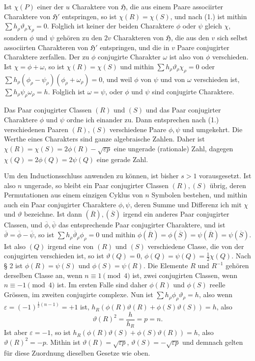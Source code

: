 \documentclass[11pt]{article}
\newcommand{\Hgr}{\mathfrak{H}}
\newcommand{\eps}{\varepsilon}
\begin{document}
Ist $\chi(P)$ einer der $u$ Charaktere von $\Hgr$, die aus einem Paare associirter Charaktere von $\Hgr'$ entspringen, so ist $\chi(R)=\chi(S)$, und nach (1.) ist mithin $\sum h_\rho\vartheta_\rho\chi_\rho=0$. Folglich ist keiner der beiden Charaktere $\phi$ oder $\psi$ gleich $\chi$, sondern $\phi$ und $\psi$ gehören zu den $2v$ Charakteren von $\Hgr$, die aus den $v$ sich selbst associirten Charakteren von $\Hgr'$ entspringen, und die in $v$ Paare conjugirter Charaktere zerfallen. Der zu $\phi$ conjugirte Charakter $\omega$ ist also von $\phi$ verschieden. Ist $\chi=\phi+\omega$, so ist $\chi(R)=\chi(S)$ und mithin $\sum h_\rho\vartheta_\rho\chi_\rho=0$ oder $\sum h_\rho(\phi_\rho-\psi_\rho)(\phi_\rho+\omega_\rho)=0$, und weil $\phi$ von $\psi$ und von $\omega$ verschieden ist, $\sum h_\rho\psi_\rho\omega_\rho=h$. Folglich ist $\omega=\psi$, oder $\phi$ und $\psi$ sind conjugirte Charaktere.

Das Paar conjugirter Classen $(R)$ und $(S)$ und das Paar conjugirter Charaktere $\phi$ und $\psi$ ordne ich einander zu. Dann entsprechen nach (1.) verschiedenen Paaren $(R),(S)$ verschiedene Paare $\phi,\psi$ und umgekehrt. Die Werthe eines Charakters sind ganze algebraische Zahlen. Daher ist $\chi(R)=\chi(S)=2\phi(R)-\sqrt{\eps p}$ eine ungerade (rationale) Zahl, dagegen $\chi(Q)=2\phi(Q)=2\psi(Q)$ eine gerade Zahl.

Um den Inductionsschluss anwenden zu können, ist bisher $s>1$ vorausgesetzt. Ist also $n$ ungerade, so bleibt ein Paar conjugirter Classen $(R),(S)$ übrig, deren Permutationen aus einem einzigen Cyklus von $n$ Symbolen bestehen, und mithin auch ein Paar conjugirter Charaktere $\phi,\psi$, deren Summe und Differenz ich mit $\chi$ und $\vartheta$ bezeichne. Ist dann $(\overline{R}),(\overline{S})$ irgend ein anderes Paar conjugirter Classen, und $\overline{\phi},\overline{\psi}$ das entsprechende Paar conjugirter Charaktere, und ist $\overline{\vartheta}=\overline{\phi}-\overline{\psi}$, so ist $\sum h_\rho\overline{\vartheta}_\rho\phi_\rho=0$ und mithin $\phi(\overline{R})=\phi(\overline{S})=\psi(\overline{R})=\psi(\overline{S})$. Ist also $(Q)$ irgend eine von $(R)$ und $(S)$ verschiedene Classe, die von der conjugirten verschieden ist, so ist $\vartheta(Q)=0$, $\phi(Q)=\psi(Q)=\frac12\chi(Q)$. Nach § 2 ist $\phi(R)=\psi(S)$ und $\phi(S)=\psi(R)$. Die Elemente $R$ und $R^{-1}$ gehören derselben Classe an, wenn $n\equiv1\pmod 4$ ist, zwei conjugirten Classen, wenn $n\equiv -1\pmod 4$ ist. Im ersten Falle sind daher $\phi(R)$ und $\phi(S)$ reelle Grössen, im zweiten conjugirte complexe. Nun ist $\sum h_\rho\phi_\rho\vartheta_\rho=h$, also wenn $\eps=(-1)^{\frac12(n-1)}=+1$ ist, $h_R(\phi(R)\vartheta(R)+\phi(S)\vartheta(S))=h$, also
\[
 \vartheta(R)^2=\frac{h}{h_R}=p=n.
\]
Ist aber $\eps=-1$, so ist $h_R(\phi(R)\vartheta(S)+\phi(S)\vartheta(R))=h$, also $\vartheta(R)^2=-p$. Mithin ist $\vartheta(R)=\sqrt{\eps p}$, $\vartheta(S)=-\sqrt{\eps p}$ und demnach gelten für diese Zuordnung dieselben Gesetze wie oben.
\end{document}
